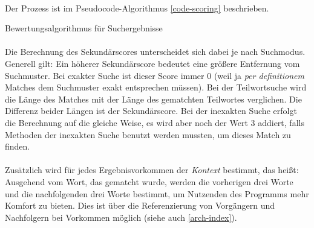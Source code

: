 \paragraph{} Der Prozess ist im Pseudocode-Algorithmus \ref{code-scoring} beschrieben.

\begin{algorithm}
\caption{Bewertungsalgorithmus für Suchergebnisse}
\label{code-scoring}
\begin{algorithmic}
	\ELSE
	\ENDIF
\ENDFOR
\end{algorithmic}
\end{algorithm}

\paragraph{} Die Berechnung des Sekundärscores unterscheidet sich dabei je nach Suchmodus. Generell gilt: Ein höherer Sekundärscore bedeutet eine größere Entfernung vom Suchmuster. Bei exakter Suche ist dieser Score immer 0 (weil ja \textit{per definitionem} Matches dem Suchmuster exakt entsprechen müssen). Bei der Teilwortsuche wird die Länge des Matches mit der Länge des gematchten Teilwortes verglichen. Die Differenz beider Längen ist der Sekundärscore. Bei der inexakten Suche erfolgt die Berechnung auf die gleiche Weise, es wird aber noch der Wert 3 addiert, falls Methoden der inexakten Suche benutzt werden mussten, um dieses Match zu finden.

\paragraph{} Zusätzlich wird für jedes Ergebnisvorkommen der \textit{Kontext} bestimmt, das heißt: Ausgehend vom Wort, das gematcht wurde, werden die vorherigen drei Worte und die nachfolgenden drei Worte bestimmt, um Nutzenden des Programms mehr Komfort zu bieten. Dies ist über die Referenzierung von Vorgängern und Nachfolgern bei Vorkommen möglich (siehe auch \ref{arch-index}).

